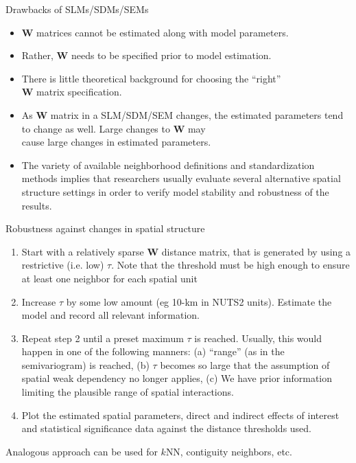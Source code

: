 \documentclass{beamer}
\begin{document}
\begin{frame}{Drawbacks of SLMs/SDMs/SEMs}
\begin{itemize}
    \item $\bm{W}$ matrices cannot be estimated along with model parameters. 
    \medskip
    \item Rather, $\bm{W}$ needs to be specified prior to model estimation. 
    \medskip
    \item There is little theoretical background for choosing the ``right'' \\$\bm{W}$ matrix specification. 
    \medskip
    \item As $\bm{W}$ matrix in a SLM/SDM/SEM changes, the estimated parameters tend to change as well. Large changes to $\bm{W}$ may \\cause large changes in estimated parameters.
    \medskip
    \item The variety of available neighborhood definitions and standardization methods implies that researchers usually evaluate several alternative spatial structure settings in order to verify model stability and robustness of the results. 
\end{itemize}
\end{frame}
\begin{frame}{Robustness against changes in spatial structure}
\begin{enumerate}
\item Start with a relatively sparse $\bm{W}$ distance matrix, that is generated by using a restrictive (i.e. low) $\tau$. Note that the threshold must be high enough to ensure at least one neighbor for each spatial unit
\medskip
\item Increase $\tau$ by some low amount (eg 10-km in NUTS2 units). Estimate the model and record all relevant information. 
\medskip
\item Repeat step 2 until a preset maximum $\tau$ is reached. Usually, this would happen in one of the following manners: (a) ``range'' (as in the semivariogram) is reached, (b) $\tau$ becomes so large that the assumption of spatial weak dependency no longer applies, (c) We have prior information limiting the plausible range of spatial interactions.
\medskip
\item Plot the estimated spatial parameters, direct and indirect effects of interest and statistical significance data  against the distance thresholds used.
\end{enumerate}
Analogous approach can be used for $k$NN, contiguity neighbors, etc.
\end{frame}
\end{document}
